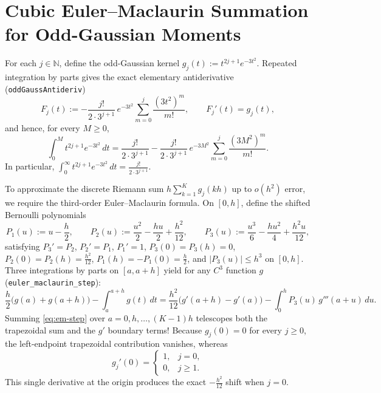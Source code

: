 \documentclass[11pt,a4paper]{article}
\numberwithin{equation}{section}
\theoremstyle{plain}
\theoremstyle{definition}
\theoremstyle{remark}
\newcommand{\N}{\mathbb{N}}
\newcommand{\code}[1]{\texttt{\small #1}}
\begin{document}
\section{Cubic Euler--Maclaurin Summation for Odd-Gaussian Moments}
\label{sec:em}

For each $j\in\N$, define the odd-Gaussian kernel $g_j(t):=t^{2j+1}e^{-3t^2}$. Repeated integration by parts gives the exact elementary antiderivative (\code{oddGaussAntideriv})
\[
  F_j(t) := -\frac{j!}{2\cdot 3^{j+1}}\,e^{-3t^2}\sum_{m=0}^{j}\frac{(3t^2)^m}{m!},
  \qquad F_j'(t) = g_j(t),
\]
and hence, for every $M\ge 0$,
\begin{equation}\label{eq:oddGauss-int}
  \int_0^M t^{2j+1}e^{-3t^2}\,dt
  = \frac{j!}{2\cdot 3^{j+1}} - \frac{j!}{2\cdot 3^{j+1}}\,e^{-3M^2}\sum_{m=0}^{j}\frac{(3M^2)^m}{m!}.
\end{equation}
In particular, $\int_0^\infty t^{2j+1}e^{-3t^2}\,dt = \frac{j!}{2\cdot 3^{j+1}}$.

To approximate the discrete Riemann sum $h\sum_{k=1}^{K} g_j(kh)$ up to $o(h^2)$ error, we require the third-order Euler--Maclaurin formula. On $[0,h]$, define the shifted Bernoulli polynomials
\[
  P_1(u) := u - \frac{h}{2}, \qquad
  P_2(u) := \frac{u^2}{2} - \frac{hu}{2} + \frac{h^2}{12}, \qquad
  P_3(u) := \frac{u^3}{6} - \frac{hu^2}{4} + \frac{h^2 u}{12},
\]
satisfying $P_3'=P_2$, $P_2'=P_1$, $P_1'=1$, $P_3(0)=P_3(h)=0$, $P_2(0)=P_2(h)=\frac{h^2}{12}$, $P_1(h)=-P_1(0)=\frac{h}{2}$, and $|P_3(u)|\le h^3$ on $[0,h]$. Three integrations by parts on $[a,a+h]$ yield for any $C^3$ function $g$ (\code{euler\_maclaurin\_step}):
\begin{equation}\label{eq:em-step}
  \frac{h}{2}\bigl(g(a)+g(a+h)\bigr) - \int_a^{a+h} g(t)\,dt
  = \frac{h^2}{12}\bigl(g'(a+h)-g'(a)\bigr) - \int_0^h P_3(u)\,g'''(a+u)\,du.
\end{equation}
Summing \eqref{eq:em-step} over $a=0,h,\dots,(K-1)h$ telescopes both the trapezoidal sum and the $g'$ boundary terms! Because $g_j(0)=0$ for every $j\ge 0$, the left-endpoint trapezoidal contribution vanishes, whereas
\begin{equation}\label{eq:em-gprime0}
  g_j'(0) = \begin{cases}
    1, & j=0,\\
    0, & j\ge 1.
  \end{cases}
\end{equation}
This single derivative at the origin produces the exact $-\frac{h^2}{12}$ shift when $j=0$.
\end{document}
